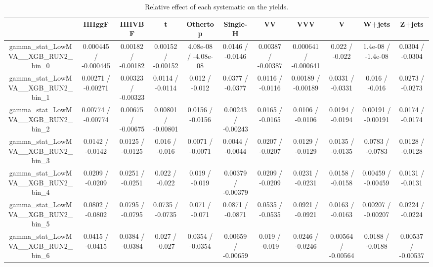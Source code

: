 \documentclass[10pt]{article}
\begin{document}
\begin{table}[htbp]
\begin{center}
\begin{tabular}{|c|c|c|c|c|c|c|c|c|c|c|}
\hline 
      & HHggF      & HHVBF      & t      & Othertop      & Single-H      & VV      & VVV      & V      & W+jets      & Z+jets \\ 
\hline 
  gamma_stat_LowMVA__XGB_RUN2_bin_0 & 0.000445 / -0.000445 & 0.00182 / -0.00182 & 0.00152 / -0.00152 & 4.08e-08 / -4.08e-08 & 0.0146 / -0.0146 & 0.00387 / -0.00387 & 0.000641 / -0.000641 & 0.022 / -0.022 & 1.4e-08 / -1.4e-08 & 0.0304 / -0.0304 \\ 
  gamma_stat_LowMVA__XGB_RUN2_bin_1 & 0.00271 / -0.00271 & 0.00323 / -0.00323 & 0.0114 / -0.0114 & 0.012 / -0.012 & 0.0377 / -0.0377 & 0.0116 / -0.0116 & 0.00189 / -0.00189 & 0.0331 / -0.0331 & 0.016 / -0.016 & 0.0273 / -0.0273 \\ 
  gamma_stat_LowMVA__XGB_RUN2_bin_2 & 0.00774 / -0.00774 & 0.00675 / -0.00675 & 0.00801 / -0.00801 & 0.0156 / -0.0156 & 0.00243 / -0.00243 & 0.0165 / -0.0165 & 0.0106 / -0.0106 & 0.0194 / -0.0194 & 0.00191 / -0.00191 & 0.0174 / -0.0174 \\ 
  gamma_stat_LowMVA__XGB_RUN2_bin_3 & 0.0142 / -0.0142 & 0.0125 / -0.0125 & 0.016 / -0.016 & 0.0071 / -0.0071 & 0.0044 / -0.0044 & 0.0207 / -0.0207 & 0.0129 / -0.0129 & 0.0135 / -0.0135 & 0.0783 / -0.0783 & 0.0128 / -0.0128 \\ 
  gamma_stat_LowMVA__XGB_RUN2_bin_4 & 0.0209 / -0.0209 & 0.0251 / -0.0251 & 0.022 / -0.022 & 0.019 / -0.019 & 0.00379 / -0.00379 & 0.0209 / -0.0209 & 0.0231 / -0.0231 & 0.0158 / -0.0158 & 0.00459 / -0.00459 & 0.0131 / -0.0131 \\ 
  gamma_stat_LowMVA__XGB_RUN2_bin_5 & 0.0802 / -0.0802 & 0.0795 / -0.0795 & 0.0735 / -0.0735 & 0.071 / -0.071 & 0.0871 / -0.0871 & 0.0535 / -0.0535 & 0.0921 / -0.0921 & 0.0163 / -0.0163 & 0.00207 / -0.00207 & 0.0224 / -0.0224 \\ 
  gamma_stat_LowMVA__XGB_RUN2_bin_6 & 0.0415 / -0.0415 & 0.0384 / -0.0384 & 0.027 / -0.027 & 0.0354 / -0.0354 & 0.00659 / -0.00659 & 0.019 / -0.019 & 0.0246 / -0.0246 & 0.00564 / -0.00564 & 0.0188 / -0.0188 & 0.00537 / -0.00537 \\ 
\hline 
\end{tabular} 
\caption{Relative effect of each systematic on the yields.} 
\end{center} 
\end{table} 
\end{document}

